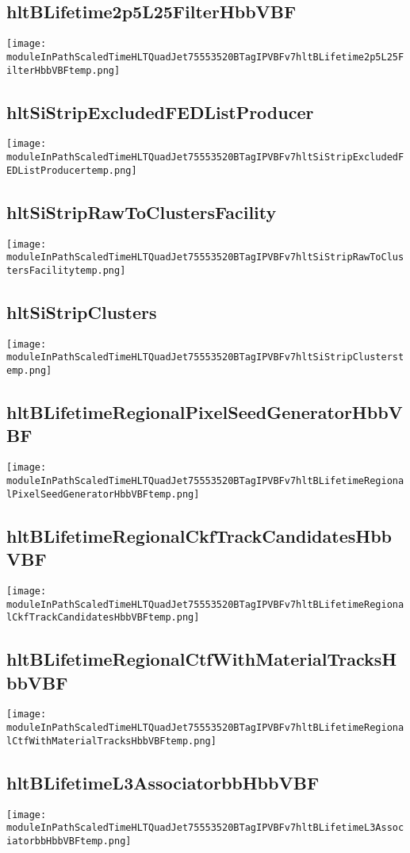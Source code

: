 \documentclass[10pt,a5paper,landscape]{report}
\begin{document}
\subsection{hltBLifetime2p5L25FilterHbbVBF} \centering \texttt{[image: moduleInPathScaledTimeHLTQuadJet75553520BTagIPVBFv7hltBLifetime2p5L25FilterHbbVBFtemp.png]}
\subsection{hltSiStripExcludedFEDListProducer} \centering \texttt{[image: moduleInPathScaledTimeHLTQuadJet75553520BTagIPVBFv7hltSiStripExcludedFEDListProducertemp.png]}
\subsection{hltSiStripRawToClustersFacility} \centering \texttt{[image: moduleInPathScaledTimeHLTQuadJet75553520BTagIPVBFv7hltSiStripRawToClustersFacilitytemp.png]}
\subsection{hltSiStripClusters} \centering \texttt{[image: moduleInPathScaledTimeHLTQuadJet75553520BTagIPVBFv7hltSiStripClusterstemp.png]}
\subsection{hltBLifetimeRegionalPixelSeedGeneratorHbbVBF} \centering \texttt{[image: moduleInPathScaledTimeHLTQuadJet75553520BTagIPVBFv7hltBLifetimeRegionalPixelSeedGeneratorHbbVBFtemp.png]}
\subsection{hltBLifetimeRegionalCkfTrackCandidatesHbbVBF} \centering \texttt{[image: moduleInPathScaledTimeHLTQuadJet75553520BTagIPVBFv7hltBLifetimeRegionalCkfTrackCandidatesHbbVBFtemp.png]}
\subsection{hltBLifetimeRegionalCtfWithMaterialTracksHbbVBF} \centering \texttt{[image: moduleInPathScaledTimeHLTQuadJet75553520BTagIPVBFv7hltBLifetimeRegionalCtfWithMaterialTracksHbbVBFtemp.png]}
\subsection{hltBLifetimeL3AssociatorbbHbbVBF} \centering \texttt{[image: moduleInPathScaledTimeHLTQuadJet75553520BTagIPVBFv7hltBLifetimeL3AssociatorbbHbbVBFtemp.png]}
\end{document}
